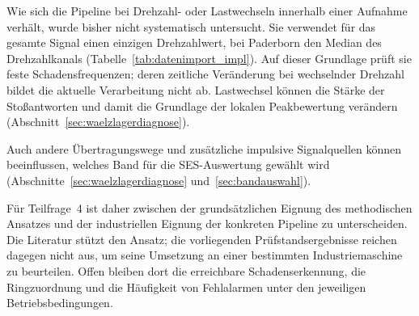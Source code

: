 Wie sich die Pipeline bei Drehzahl- oder Lastwechseln innerhalb einer
Aufnahme verhält, wurde bisher nicht systematisch untersucht. Sie verwendet für
das gesamte Signal einen einzigen Drehzahlwert, bei Paderborn den Median
des Drehzahlkanals (Tabelle~\ref{tab:datenimport_impl}). Auf dieser
Grundlage prüft sie feste Schadensfrequenzen; deren zeitliche Veränderung
bei wechselnder Drehzahl bildet die aktuelle Verarbeitung nicht ab.
Lastwechsel können die Stärke der Stoßantworten und damit die Grundlage
der lokalen Peakbewertung verändern
(Abschnitt~\ref{sec:waelzlagerdiagnose}).

Auch andere Übertragungswege und zusätzliche impulsive Signalquellen
können beeinflussen, welches Band für die SES-Auswertung gewählt wird
(Abschnitte~\ref{sec:waelzlagerdiagnose} und~\ref{sec:bandauswahl}).

Für Teilfrage~4 ist daher zwischen der grundsätzlichen Eignung des
methodischen Ansatzes und der industriellen Eignung der konkreten Pipeline
zu unterscheiden. Die Literatur stützt den Ansatz; die vorliegenden
Prüfstandsergebnisse reichen dagegen nicht aus, um seine Umsetzung an
einer bestimmten Industriemaschine zu beurteilen. Offen bleiben dort
die erreichbare Schadenserkennung, die Ringzuordnung und die Häufigkeit
von Fehlalarmen unter den jeweiligen Betriebsbedingungen.
